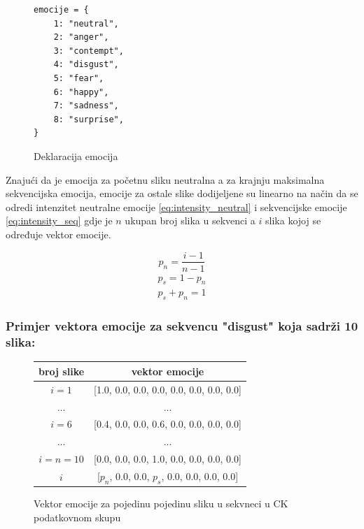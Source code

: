 \documentclass[times, utf8, zavrsni,numeric,pstricks]{fer}
\begin{document}
\begin{figure}[H]
\centering
\begin{Verbatim}[fontsize=\small]
emocije = {
    1: "neutral",
    2: "anger",
    3: "contempt",
    4: "disgust",
    5: "fear",
    6: "happy",
    7: "sadness",
    8: "surprise",
}
\end{Verbatim}
\caption{Deklaracija emocija}
\label{cb:emo_declare}
\end{figure}

\noindent
Znajući da je emocija za početnu sliku neutralna a za krajnju maksimalna sekvencijska emocija, emocije za ostale slike dodijeljene su linearno na način da se odredi intenzitet neutralne emocije \ref{eq:intensity_neutral} i sekvencijske emocije \ref{eq:intensity_seq} gdje je $n$ ukupan broj slika u sekvenci a $i$ slika kojoj se određuje vektor emocije.

\begin{equation}\label{eq:intensity_neutral}
	p_{n} = \dfrac{i-1}{n-1}	
\end{equation}
\begin{equation}\label{eq:intensity_seq}
\begin{split}
	p_{s} = 1 - p_{n}\\
	p_{s} + p_{n} = 1	
\end{split}
\end{equation}

\subsubsection{Primjer vektora emocije za sekvencu "disgust" koja sadrži 10 slika:}

\begin{figure}[H]
\centering
\begin{tabular}{|c|c|} 
\hline
broj slike & vektor emocije \\
\hline
$i = 1$ & [1.0, 0.0, 0.0, 0.0, 0.0, 0.0, 0.0, 0.0] \\
... & ... \\
$i = 6$ & [0.4, 0.0, 0.0, 0.6, 0.0, 0.0, 0.0, 0.0] \\
... & ... \\
$i = n = 10$ & [0.0, 0.0, 0.0, 1.0, 0.0, 0.0, 0.0, 0.0] \\
$i$ & [$p_n$, 0.0, 0.0, $p_s$, 0.0, 0.0, 0.0, 0.0]  \\
\hline
\end{tabular}
\caption{Vektor emocije za pojedinu pojedinu sliku u sekvneci u CK podatkovnom skupu}
\label{pic:ck_emotion_rise}
\end{figure}
\end{document}
